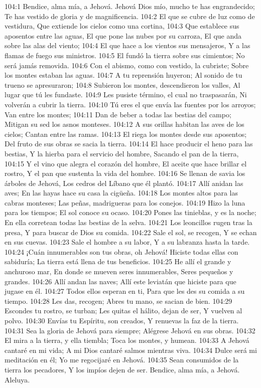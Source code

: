 104:1 Bendice, alma mía, a Jehová. 
Jehová Dios mío, mucho te has engrandecido; 
Te has vestido de gloria y de magnificencia. 
104:2 El que se cubre de luz como de vestidura, 
Que extiende los cielos como una cortina, 
104:3 Que establece sus aposentos entre las aguas, 
El que pone las nubes por su carroza, 
El que anda sobre las alas del viento; 
104:4 El que hace a los vientos sus mensajeros, 
Y a las flamas de fuego sus ministros. 
104:5 El fundó la tierra sobre sus cimientos; 
No será jamás removida. 
104:6 Con el abismo, como con vestido, la cubriste; 
Sobre los montes estaban las aguas. 
104:7 A tu reprensión huyeron; 
Al sonido de tu trueno se apresuraron; 
104:8 Subieron los montes, descendieron los valles, 
Al lugar que tú les fundaste. 
104:9 Les pusiste término, el cual no traspasarán, 
Ni volverán a cubrir la tierra. 
104:10 Tú eres el que envía las fuentes por los arroyos; 
Van entre los montes; 
104:11 Dan de beber a todas las bestias del campo; 
Mitigan su sed los asnos monteses. 
104:12 A sus orillas habitan las aves de los cielos; 
Cantan entre las ramas. 
104:13 El riega los montes desde sus aposentos; 
Del fruto de sus obras se sacia la tierra. 
104:14 El hace producir el heno para las bestias, 
Y la hierba para el servicio del hombre, 
Sacando el pan de la tierra, 
104:15 Y el vino que alegra el corazón del hombre, 
El aceite que hace brillar el rostro, 
Y el pan que sustenta la vida del hombre. 
104:16 Se llenan de savia los árboles de Jehová, 
Los cedros del Líbano que él plantó. 
104:17 Allí anidan las aves; 
En las hayas hace su casa la cigüeña. 
104:18 Los montes altos para las cabras monteses; 
Las peñas, madrigueras para los conejos. 
104:19 Hizo la luna para los tiempos; 
El sol conoce su ocaso. 
104:20 Pones las tinieblas, y es la noche; 
En ella corretean todas las bestias de la selva. 
104:21 Los leoncillos rugen tras la presa, 
Y para buscar de Dios su comida. 
104:22 Sale el sol, se recogen, 
Y se echan en sus cuevas. 
104:23 Sale el hombre a su labor, 
Y a su labranza hasta la tarde. 
104:24 ¡Cuán innumerables son tus obras, oh Jehová! 
Hiciste todas ellas con sabiduría; 
La tierra está llena de tus beneficios. 
104:25 He allí el grande y anchuroso mar, 
En donde se mueven seres innumerables, 
Seres pequeños y grandes. 
104:26 Allí andan las naves; 
Allí este leviatán que hiciste para que jugase en él. 
104:27 Todos ellos esperan en ti, 
Para que les des su comida a su tiempo. 
104:28 Les das, recogen; 
Abres tu mano, se sacian de bien. 
104:29 Escondes tu rostro, se turban; 
Les quitas el hálito, dejan de ser, 
Y vuelven al polvo. 
104:30 Envías tu Espíritu, son creados, 
Y renuevas la faz de la tierra. 
104:31 Sea la gloria de Jehová para siempre; 
Alégrese Jehová en sus obras. 
104:32 El mira a la tierra, y ella tiembla; 
Toca los montes, y humean. 
104:33 A Jehová cantaré en mi vida; 
A mi Dios cantaré salmos mientras viva. 
104:34 Dulce será mi meditación en él; 
Yo me regocijaré en Jehová. 
104:35 Sean consumidos de la tierra los pecadores, 
Y los impíos dejen de ser. 
Bendice, alma mía, a Jehová. 
Aleluya. 
